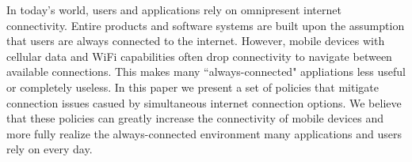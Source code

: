 
In today's world, users and applications rely on omnipresent internet connectivity. Entire products and software systems are built upon the assumption that users are always connected to the internet. However, mobile devices with cellular data and WiFi capabilities often drop connectivity to navigate between available connections. This makes many ``always-connected" appliations less useful or completely useless. In this paper we present a set of policies that mitigate connection issues casued by simultaneous internet connection options. We believe that these policies can greatly increase the connectivity of mobile devices and more fully realize the always-connected environment many applications and users rely on every day.